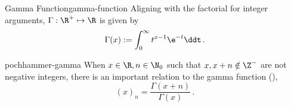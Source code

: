 \begin{definition}{Gamma Function}{gamma-function}
  Aligning with the factorial for integer arguments, $\Gamma: \R^+ \mapsto \R$ is given by
  $$\Gamma(x) := \int_0^\infty t^{x-1}\e^{-t} \ddt\,.$$
\end{definition}

\begin{remark}{}{pochhammer-gamma}
  When $x \in \R, n \in \N_0$ such that $x, x+n \notin \Z^-$ are not negative integers, there is an important relation to the gamma function (),
  $$(x)_n = \frac{\Gamma(x+n)}{\Gamma(x)}\,.$$
\end{remark}
